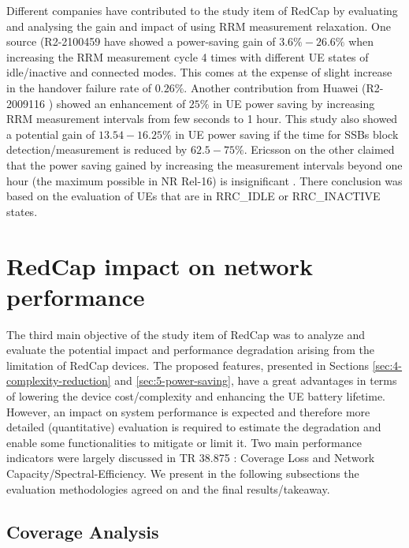 \documentclass[conference]{IEEEtran}
\begin{document}
Different companies have contributed to the study item of RedCap \cite{3gpp_study_2021_38.875} by evaluating and analysing the gain and impact of using RRM measurement relaxation. One source (R2-2100459 \cite{3gpp_tp_2021_R2-2100459} have showed a power-saving gain of $3.6\% - 26.6\%$ when increasing the RRM measurement cycle 4 times with different UE states of idle/inactive and connected modes. This comes at the expense of slight increase in the handover failure rate of $0.26\%$.
Another contribution from Huawei (R2-2009116 \cite{3gpp_further_2020_R2-2009116}) showed an enhancement of $25\%$ in UE power saving by increasing RRM measurement intervals from few seconds to 1 hour. This study also showed a potential gain of $13.54-16.25\%$ in UE power saving if the time for SSBs block detection/measurement is reduced by $62.5-75\%$.
Ericsson on the other claimed that the power saving gained by increasing the measurement intervals beyond one hour (the maximum possible in NR Rel-16) is insignificant \cite{3gpp_redcap_2020_R2-2009620}. There conclusion was based on the evaluation of UEs that are in RRC\_IDLE or RRC\_INACTIVE states.


\section{RedCap impact on network performance}
\label{sec:6-redcap-impact}
The third main objective of the study item of RedCap was to analyze and evaluate the potential impact and performance degradation arising from the limitation of RedCap devices. The  proposed features, presented in Sections \ref{sec:4-complexity-reduction} and \ref{sec:5-power-saving}, have a great advantages in terms of lowering the device cost/complexity and enhancing the UE battery lifetime. However, an impact on system performance is expected and therefore more detailed (quantitative) evaluation is required to estimate the degradation and enable some functionalities to mitigate or limit it. Two main performance indicators were largely discussed in TR 38.875 \cite{3gpp.38.875}: Coverage Loss and Network Capacity/Spectral-Efficiency. We present in the following subsections the evaluation methodologies agreed on and the final results/takeaway.  

\subsection{Coverage Analysis}
\label{sec:6-1}
\end{document}
